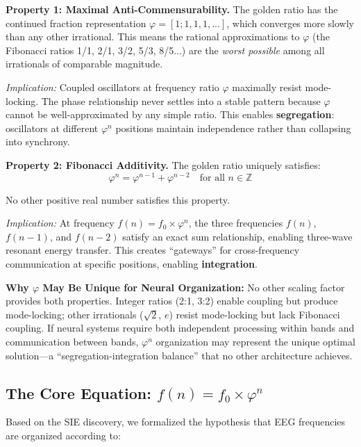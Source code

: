 \documentclass[11pt,a4paper]{article}
\newcommand{\phisym}{\varphi}
\begin{document}
\textbf{Property 1: Maximal Anti-Commensurability.}
The golden ratio has the continued fraction representation $\phisym = [1; 1, 1, 1, ...]$, which converges more slowly than any other irrational. This means the rational approximations to $\phisym$ (the Fibonacci ratios 1/1, 2/1, 3/2, 5/3, 8/5...) are the \textit{worst possible} among all irrationals of comparable magnitude.

\textit{Implication:} Coupled oscillators at frequency ratio $\phisym$ maximally resist mode-locking. The phase relationship never settles into a stable pattern because $\phisym$ cannot be well-approximated by any simple ratio. This enables \textbf{segregation}: oscillators at different $\phisym^n$ positions maintain independence rather than collapsing into synchrony.

\textbf{Property 2: Fibonacci Additivity.}
The golden ratio uniquely satisfies:
\begin{equation}
\phisym^n = \phisym^{n-1} + \phisym^{n-2} \quad \text{for all } n \in \mathbb{Z}
\end{equation}

No other positive real number satisfies this property.

\textit{Implication:} At frequency $f(n) = f_0 \times \phisym^n$, the three frequencies $f(n)$, $f(n-1)$, and $f(n-2)$ satisfy an exact sum relationship, enabling three-wave resonant energy transfer. This creates ``gateways'' for cross-frequency communication at specific positions, enabling \textbf{integration}.

\begin{keyinsight}
\textbf{Why $\phisym$ May Be Unique for Neural Organization:}
No other scaling factor provides both properties. Integer ratios (2:1, 3:2) enable coupling but produce mode-locking; other irrationals ($\sqrt{2}$, $e$) resist mode-locking but lack Fibonacci coupling. If neural systems require both independent processing within bands and communication between bands, $\phisym^n$ organization may represent the unique optimal solution---a ``segregation-integration balance'' that no other architecture achieves.
\end{keyinsight}

\subsection{The Core Equation: $f(n) = f_0 \times \phisym^n$}

Based on the SIE discovery, we formalized the hypothesis that EEG frequencies are organized according to:
\end{document}
